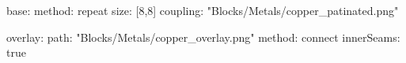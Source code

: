 base:
  method: repeat
  size: [8,8]
  coupling: "Blocks/Metals/copper_patinated.png"
  
overlay:
  path: "Blocks/Metals/copper_overlay.png"
  method: connect
  innerSeams: true